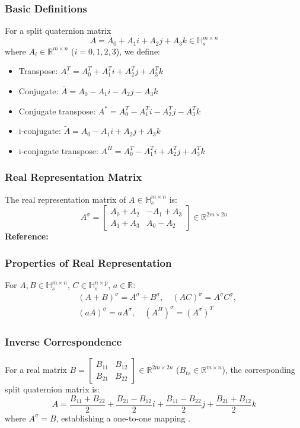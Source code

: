 \documentclass{beamer}
\begin{document}
\begin{frame}
    \frametitle{Basic Definitions}
    For a split quaternion matrix 
    \[
    A = A_0 + A_1i + A_2j + A_3k \in \mathbb{H}_s^{m \times n}
    \]
    where \(A_i \in \mathbb{R}^{m \times n}\) (\(i = 0,1,2,3\)), we define:
    \begin{itemize}
        \item Transpose: \(A^T = A_0^T + A_1^Ti + A_2^Tj + A_3^Tk\)
        \item Conjugate: \(\bar{A} = A_0 - A_1i - A_2j - A_3k\)
        \item Conjugate transpose: \(A^* = A_0^T - A_1^Ti - A_2^Tj - A_3^Tk\)
        \item i-conjugate: \(\tilde{A} = A_0 - A_1i + A_2j + A_3k\)
        \item i-conjugate transpose: \(A^H = A_0^T - A_1^Ti + A_2^Tj + A_3^Tk\)
    \end{itemize}
\end{frame}

\begin{frame}
    \frametitle{Real Representation Matrix}
    The real representation matrix of \(A \in \mathbb{H}_s^{m \times n}\) is:
    \begin{equation}
    A^\sigma = \begin{bmatrix} A_0 + A_2 & -A_1 + A_3 \\ A_1 + A_3 & A_0 - A_2 \end{bmatrix} \in \mathbb{R}^{2m \times 2n}
    \end{equation}
    \vspace{0.5cm}
    \textbf{Reference:} \cite{TJiang2018, Gang2024}
\end{frame}

\begin{frame}
    \frametitle{Properties of Real Representation}
    For \(A, B \in \mathbb{H}_s^{m \times n}\), \(C \in \mathbb{H}_s^{n \times p}\), \(a \in \mathbb{R}\):
    \begin{equation}
    \begin{split}
    &(A + B)^\sigma = A^\sigma + B^\sigma, \quad (AC)^\sigma = A^\sigma C^\sigma, \\
    &(a A)^\sigma = a A^\sigma, \quad (A^H)^\sigma = (A^\sigma)^T
    \end{split}
    \end{equation}
\end{frame}

\begin{frame}
    \frametitle{Inverse Correspondence}
    For a real matrix \(B = \begin{bmatrix} B_{11} & B_{12} \\ B_{21} & B_{22} \end{bmatrix} \in \mathbb{R}^{2m \times 2n}\) (\(B_{ts} \in \mathbb{R}^{m \times n}\)), the corresponding split quaternion matrix is:
    \begin{equation}
    A = \frac{B_{11} + B_{22}}{2} + \frac{B_{21} - B_{12}}{2}i + \frac{B_{11} - B_{22}}{2}j + \frac{B_{21} + B_{12}}{2}k
    \end{equation}
    where \(A^\sigma = B\), establishing a one-to-one mapping \cite{Gang2024}.
\end{frame}
\end{document}
